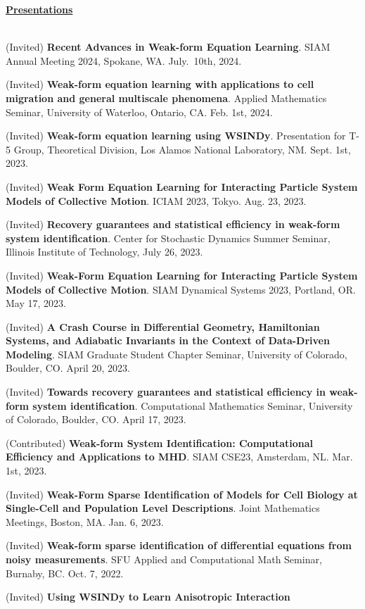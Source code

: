 \documentclass[letterpaper,11pt,oneside]{article}
\newcommand{\headr}[1]{\vspace{10pt}\uline{\Large{\textbf{#1}} \hfill } \\ \vspace{-10pt}\\}
\begin{document}
\headr{Presentations}
\vspace{-0.5cm}
\begin{enumerate}[label={[\arabic*]}]
\item (Invited) \textbf{Recent Advances in Weak-form Equation Learning}. SIAM Annual Meeting 2024, Spokane, WA. July.\ 10th, 2024.
\item (Invited) \textbf{Weak-form equation learning with applications to cell migration and general multiscale phenomena}. Applied Mathematics Seminar, University of Waterloo, Ontario, CA. Feb. 1st, 2024.
\item (Invited) \textbf{Weak-form equation learning using WSINDy}. Presentation for T-5 Group, Theoretical Division, Los Alamos National Laboratory, NM. Sept. 1st, 2023.
\item (Invited) \textbf{Weak Form Equation Learning for Interacting Particle System
Models of Collective Motion}. ICIAM 2023, Tokyo. Aug. 23, 2023.
\item (Invited) \textbf{Recovery guarantees and statistical efficiency in weak-form
system identification}. Center for Stochastic Dynamics Summer Seminar, Illinois Institute of Technology, July 26, 2023.
\item (Invited) \textbf{Weak-Form Equation Learning for Interacting Particle System Models of Collective Motion}. SIAM Dynamical Systems 2023, Portland, OR. May 17, 2023.
\item (Invited) \textbf{A Crash Course in Differential Geometry, Hamiltonian Systems, and Adiabatic Invariants in the Context of Data-Driven Modeling}. SIAM Graduate Student Chapter Seminar, University of Colorado, Boulder, CO. April 20, 2023.
\item (Invited) \textbf{Towards recovery guarantees and statistical efficiency in weak-form system identification}. Computational Mathematics Seminar, University of Colorado, Boulder, CO. April 17, 2023.
\item (Contributed) \textbf{Weak-form System Identification: Computational Efficiency and Applications to MHD}. SIAM CSE23, Amsterdam, NL. Mar. 1st, 2023.
\item (Invited) \textbf{Weak-Form Sparse Identification of Models for Cell Biology at Single-Cell and Population Level Descriptions}. Joint Mathematics Meetings, Boston, MA. Jan. 6, 2023.
\item (Invited) \textbf{Weak-form sparse identification of differential equations from noisy measurements}. SFU Applied and Computational Math Seminar, Burnaby, BC. Oct. 7, 2022.
\item (Invited) \textbf{Using WSINDy to Learn Anisotropic Interaction 
}
\end{enumerate}
\end{document}
